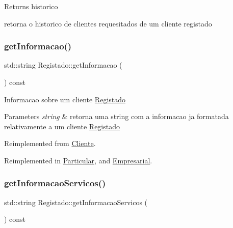 \begin{DoxyReturn}{Returns}
historico
\end{DoxyReturn}
retorna o historico de clientes requesitados de um cliente registado \hypertarget{class_registado_a7017f0d74afd44459c3d6affcb303d52}{}\label{class_registado_a7017f0d74afd44459c3d6affcb303d52} 
\subsubsection{\texorpdfstring{get\+Informacao()}{getInformacao()}}
{\footnotesize\ttfamily std\+::string Registado\+::get\+Informacao (\begin{DoxyParamCaption}{ }\end{DoxyParamCaption}) const\hspace{0.3cm}{\ttfamily [virtual]}}

Informacao sobre um cliente \hyperlink{class_registado}{Registado}


\begin{DoxyParams}{Parameters}
{\em string} & retorna uma string com a informacao ja formatada relativamente a um cliente \hyperlink{class_registado}{Registado} \\
\hline
\end{DoxyParams}


Reimplemented from \hyperlink{class_cliente_a932ef71b2792dc5df153f82d3e81a6f3}{Cliente}.



Reimplemented in \hyperlink{class_particular_acde85dcb3d26ca3afe131fb4c35763c8}{Particular}, and \hyperlink{class_empresarial_a28090b6b3db16b6b7ba03d6308c2c309}{Empresarial}.

\hypertarget{class_registado_a15109adc7cd6a8834bd2ef909bcde008}{}\label{class_registado_a15109adc7cd6a8834bd2ef909bcde008} 
\subsubsection{\texorpdfstring{get\+Informacao\+Servicos()}{getInformacaoServicos()}}
{\footnotesize\ttfamily std\+::string Registado\+::get\+Informacao\+Servicos (\begin{DoxyParamCaption}{ }\end{DoxyParamCaption}) const\hspace{0.3cm}{\ttfamily [virtual]}}

